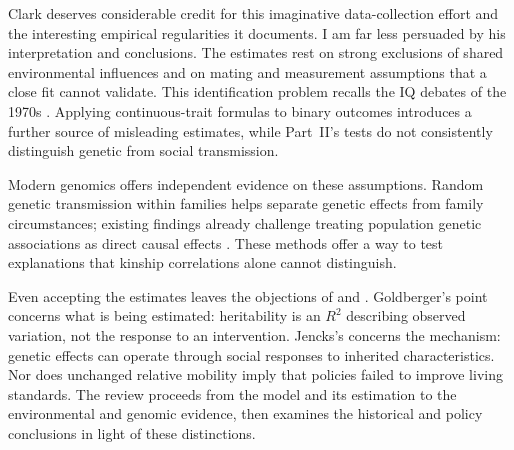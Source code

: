 Clark deserves considerable credit for this imaginative data-collection
effort and the interesting empirical regularities it documents. I am
far less persuaded by his interpretation and conclusions. The estimates
rest on strong exclusions of shared environmental influences and on
mating and measurement assumptions that a close fit cannot validate.
This identification problem recalls the IQ debates of the 1970s
\citep{Loehlin1978,Goldberger1978}. Applying continuous-trait formulas to
binary outcomes introduces a further source of misleading estimates,
while Part~II's tests do not consistently distinguish genetic from
social transmission.

Modern genomics offers independent evidence on these assumptions.
Random genetic transmission within families helps separate genetic
effects from family circumstances; existing findings already challenge
treating population genetic associations as direct causal effects
\citep{YoungEtAl2019,YoungEtAl2022}. These methods offer a way to test
explanations that kinship correlations alone cannot distinguish.

Even accepting the estimates leaves the objections of
\citet{Goldberger1979} and \citet{Jencks1980}. Goldberger's point concerns
what is being estimated: heritability is an $R^2$ describing observed
variation, not the response to an intervention. Jencks's concerns the
mechanism: genetic effects can operate through social responses to
inherited characteristics. Nor does unchanged relative mobility imply
that policies failed to improve living standards. The review proceeds
from the model and its estimation to the environmental and genomic
evidence, then examines the historical and policy conclusions in light
of these distinctions.
